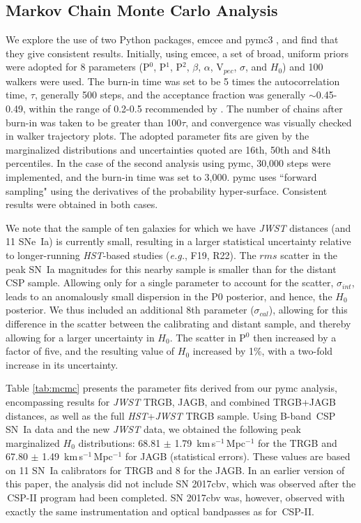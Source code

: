 \documentclass[12pt,modern]{aastex631}
\newcommand{\csp}{\,CSP\xspace}
\newcommand{\cspii}{\,CSP-II\xspace}
\newcommand{\ho}{$H_{0}$\xspace}
\newcommand{\hounits}{\,km\,s$^{-1}$\,Mpc$^{-1}$\xspace}
\newcommand{\hst}{\emph{HST}\xspace}
\newcommand{\jwst}{\emph{JWST}\xspace}
\newcommand{\sne}{SNe~Ia\xspace}
\newcommand{\sn}{SN~Ia\xspace}
\begin{document}
\subsection{Markov Chain Monte Carlo Analysis}
\label{sec:mcmc}

 We explore the use of two  Python packages, {\ttfamily emcee} \citep{foreman-mackey_2013} and {\ttfamily pymc3} \citep{pymc_2023}, and find that they give consistent results. 
 Initially, using {\ttfamily emcee}, a set of broad, uniform priors were adopted for 8 parameters (P$^0$, P$^1$, P$^2$, $\beta$, $\alpha$, V$_{pec}$, $\sigma$, and \ho) and 100 walkers were used. The burn-in time was set to be 5 times the autocorrelation time, $\tau$, generally 500 steps, and the acceptance fraction was generally $\sim$0.45-0.49, within the range of 0.2-0.5 recommended by \citet{gelman_1996}. The number of chains after burn-in was taken to be greater than 100$\tau$, and convergence was visually checked in walker trajectory plots. The adopted parameter fits are given by the marginalized distributions and uncertainties quoted are 16th, 50th and 84th percentiles. In the case of the second analysis using  {\ttfamily pymc}, 30,000 steps were implemented, and the burn-in time was set to 3,000. 
 {\ttfamily pymc} uses ``forward sampling" using the derivatives of the probability hyper-surface. Consistent results were obtained in both cases. 

 We note that the sample of ten galaxies for which we have \jwst distances (and 11 \sne)  is currently small, resulting in a larger statistical uncertainty relative to longer-running \hst-based studies ({\it e.g.}, F19, R22). The $rms$ scatter in the peak \sn magnitudes for this nearby sample is smaller than for  the distant \csp sample. Allowing only for a single parameter to account for the scatter, $\sigma_{int}$, leads to an anomalously small dispersion in the P0 posterior, and hence, the \ho posterior. We thus included an additional 8th parameter ($\sigma_{cal}$), allowing for this difference in the scatter between the calibrating and distant sample, and thereby allowing for a larger uncertainty  in \ho. The scatter in P$^0$ then increased by a factor of five, and the resulting value of \ho increased by 1\%, with a two-fold increase in its uncertainty. 
 
 
Table \ref{tab:mcmc} presents the parameter fits derived from our {\ttfamily pymc} analysis, encompassing results for \jwst TRGB, JAGB, and combined TRGB+JAGB distances, as well as the full \hst+\jwst TRGB sample. Using B-band \csp \sn data and the new \jwst data, we obtained the following peak marginalized \ho distributions: 68.81 $\pm$ 1.79 \hounits for the TRGB and 67.80 $\pm$ 1.49 \hounits for JAGB (statistical errors). These values are based on 11 \sn calibrators for TRGB and 8 for the JAGB. In an earlier version of this paper, the analysis did not include SN 2017cbv, which was observed after the \cspii program had been completed. SN 2017cbv was, however, observed with exactly the same instrumentation and optical bandpasses as for \cspii \citep[see][]{burns_2020}.
\end{document}
